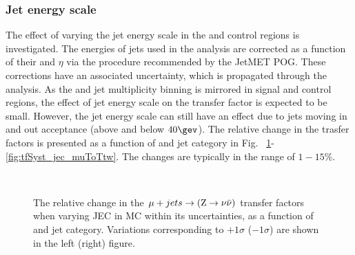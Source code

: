 \subsubsection*{Jet energy scale}
\label{sec:tfSyst_jec}
The effect of varying the jet energy scale in
the \mj and \mmj control regions is investigated.  The energies of
jets used in the analysis are corrected as a function of their \pt and
$\eta$ via the procedure recommended by the JetMET POG. These
corrections have an associated uncertainty, which is propagated through the analysis. 
As the \scalht and jet multiplicity binning is mirrored in signal and control regions, 
the effect of jet energy scale on the transfer factor is expected to be small. 
However, the jet energy scale can still have an
effect due to jets moving in and out acceptance (above and below
$40\gev$). The relative change in the trasfer factors is presented as a function of \scalht and jet category 
in Fig. ~\ref{fig:tfSyst_jec_muToZinv}-\ref{fig:tfSyst_jec_muToTtw}.
The changes are typically in the range of $1-15\%$.


\begin{figure}[]
  \centering
   ~~
  \\

  \caption{\label{fig:tfSyst_jec_muToZinv} The relative change in the
  $\mj \rightarrow (\znunu)$ transfer
  factors when varying JEC in MC within its uncertainties, as a function of \scalht and jet category. 
  Variations corresponding to $+1\sigma$ ($-1\sigma$) are shown in the left (right) figure. 
  }
\end{figure}

